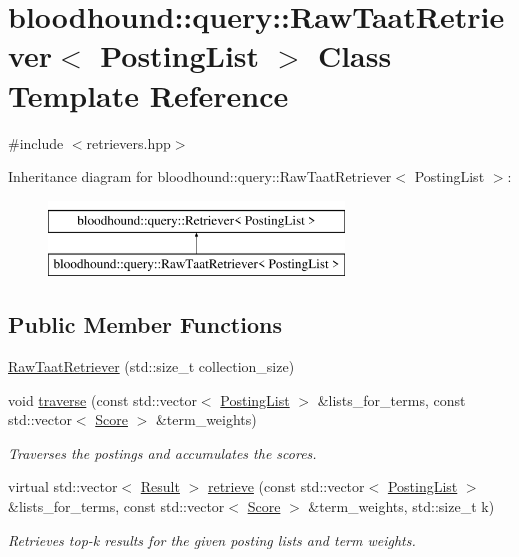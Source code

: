 \hypertarget{classbloodhound_1_1query_1_1RawTaatRetriever}{}\section{bloodhound\+:\+:query\+:\+:Raw\+Taat\+Retriever$<$ Posting\+List $>$ Class Template Reference}
\label{classbloodhound_1_1query_1_1RawTaatRetriever}


{\ttfamily \#include $<$retrievers.\+hpp$>$}

Inheritance diagram for bloodhound\+:\+:query\+:\+:Raw\+Taat\+Retriever$<$ Posting\+List $>$\+:\begin{figure}[H]
\begin{center}
\leavevmode
\includegraphics[height=2.000000cm]{classbloodhound_1_1query_1_1RawTaatRetriever}
\end{center}
\end{figure}
\subsection*{Public Member Functions}
\begin{DoxyCompactItemize}
\item 
\mbox{\hyperlink{classbloodhound_1_1query_1_1RawTaatRetriever_a859b1cd2092da229964e2795c4445d72}{Raw\+Taat\+Retriever}} (std\+::size\+\_\+t collection\+\_\+size)
\item 
void \mbox{\hyperlink{classbloodhound_1_1query_1_1RawTaatRetriever_a70007a6dd5213e9c28266e38b424ba20}{traverse}} (const std\+::vector$<$ \mbox{\hyperlink{classbloodhound_1_1PostingList}{Posting\+List}} $>$ \&lists\+\_\+for\+\_\+terms, const std\+::vector$<$ \mbox{\hyperlink{structbloodhound_1_1Score}{Score}} $>$ \&term\+\_\+weights)
\begin{DoxyCompactList}\small\item\em Traverses the postings and accumulates the scores. \end{DoxyCompactList}\item 
virtual std\+::vector$<$ \mbox{\hyperlink{structbloodhound_1_1query_1_1Result}{Result}} $>$ \mbox{\hyperlink{classbloodhound_1_1query_1_1RawTaatRetriever_aafaaf842fdaef297a255e28766af2c0d}{retrieve}} (const std\+::vector$<$ \mbox{\hyperlink{classbloodhound_1_1PostingList}{Posting\+List}} $>$ \&lists\+\_\+for\+\_\+terms, const std\+::vector$<$ \mbox{\hyperlink{structbloodhound_1_1Score}{Score}} $>$ \&term\+\_\+weights, std\+::size\+\_\+t k)
\begin{DoxyCompactList}\small\item\em Retrieves top-\/k results for the given posting lists and term weights. \end{DoxyCompactList}\end{DoxyCompactItemize}


